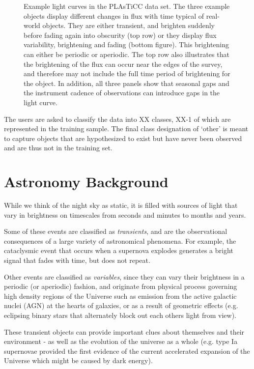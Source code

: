 \documentclass[\docopts]{\docclass}
\begin{document}
\begin{figure}[htbp!]
\begin{center}
\caption{Example light curves in the PLAsTiCC data set. The three example objects display different changes in flux with time typical of real-world objects. They are either transient, and brighten suddenly before fading again into obscurity (top row) or they display flux variability, brightening and fading (bottom figure). This brightening can either be periodic or aperiodic. The top row also illustrates that the brightening of the flux can occur near the edges of the survey, and therefore may not include the full time period of brightening for the object. In addition, all three panels show that seasonal gaps and the instrument cadence of observations can introduce gaps in the light curve.\label{fig:lc}}
\end{center}
\end{figure}
The users are asked to classify the data into XX classes, XX-1 of which are represented in the training sample. The final class designation of `other' is meant to capture objects that are hypothesized to exist but have never been observed and are thus not in the training set.


\section{Astronomy Background}
While we think of the night sky as static, it is filled with sources of light that vary in brightness on timescales from seconds and minutes to months and years. 

Some of these events are classified as \textit{transients}, and are the
observational consequences of a large variety of astronomical phenomena. For example, the cataclysmic event that occurs when a supernova explodes generates a bright signal that fades with time, but does not repeat.

Other events are classified as \textit{variables}, since they can vary their brightness in a periodic (or aperiodic) fashion, and originate from physical process governing high density regions of the Universe such as emission from the active galactic nuclei (AGN) at the hearts of galaxies, or as a result of geometric effects (e.g. eclipsing binary stars that alternately block out each others light from view).


These transient objects can provide important clues about themselves and their environment - as well as the evolution of the universe as a whole (e.g. type Ia supernovae provided the first evidence of the current accelerated expansion of the Universe which might be caused by dark energy). 
\end{document}
